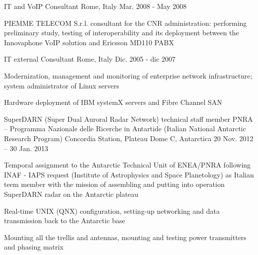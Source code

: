\begin{cventries}

	\vspace{0mm}
    \cventry
    {IT and VoIP Consultant} %
    {} %
    {Rome, Italy} %
    {Mar. 2008 - May 2008} %
    { %
    	\begin{cvitems}
    		\item {PIEMME TELECOM S.r.l. consultant for the CNR administration: performing preliminary study, testing of interoperability and its deployment between the Innovaphone VoIP solution and Ericsson MD110 PABX}
    	\end{cvitems}
    }


    \vspace{0mm}
    \cventry
    {IT external Consultant} %
    {} %
    {Rome, Italy} %
    {Dic. 2005 - dic 2007} %
    { %
    	\begin{cvitems}
    		\item {Modernization, management and monitoring of enterprise network infrastructure; system administrator of Linux servers}
    		\item {Hardware deployment of IBM systemX servers and Fibre Channel SAN}
    	\end{cvitems}
    }

\vspace{3mm}
\cventry
{SuperDARN (Super Dual Auroral Radar Network) technical staff member} %
{PNRA – Programma Nazionale delle Ricerche in Antartide (Italian National Antarctic Research Program)} %
{Concordia Station, Plateau Dome C, Antarctica} %
{20 Nov. 2012 – 30 Jan. 2013} %
{ %
\begin{cvitems}
\item {Temporal assignment to the Antarctic Technical Unit of ENEA/PNRA following INAF - IAPS request (Institute of Astrophysics and Space Planetology) 	as Italian teem member with the mission of assembling and putting into operation SuperDARN radar on the Antarctic plateau}
\item {Real-time UNIX (QNX) configuration, setting-up networking and data transmission back to the Antarctic base}
\item {Mounting all the trellis and antennas, mounting and testing power transmitters and phasing matrix}
\end{cvitems}
}


\end{cventries}
